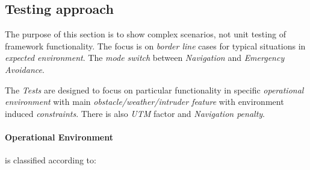 \subsection{Testing approach}\label{s:testingApproach}

\noindent The purpose of this section is to show complex scenarios, not unit testing of framework functionality. The focus is on \emph{border line} cases for typical situations in \emph{expected environment}. The \emph{mode switch} between \emph{Navigation} and \emph{Emergency Avoidance}.

The \emph{Tests} are designed to focus on particular functionality in specific \emph{operational environment} with main \emph{obstacle/weather/intruder feature} with environment induced \emph{constraints}. There is also \emph{UTM} factor and \emph{Navigation penalty}.

\paragraph{Operational Environment} is classified according to:

